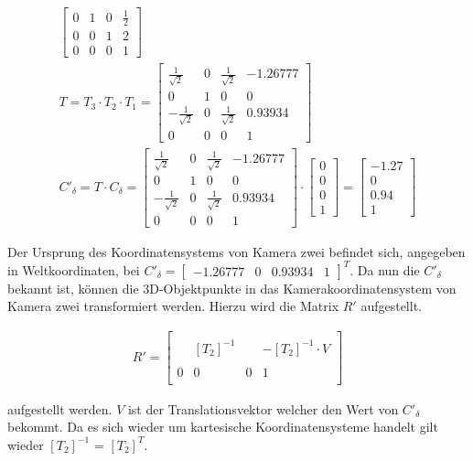 \begin{gather}
\begin{bmatrix}
	0&1&0&\frac{1}{2}\\
	0&0&1&2\\
	0&0&0&1
	\end{bmatrix}\\
	T= 
	T_3 \cdot T_2 \cdot T_1
	= 
	\begin{bmatrix}
	\frac{1}{\sqrt{2}}&0&\frac{1}{\sqrt{2}}&-1.26777\\
	0&1&0&0\\
	-\frac{1}{\sqrt{2}}&0&\frac{1}{\sqrt{2}}&0.93934\\
	0&0&0&1
	\end{bmatrix}\\
	C'_\delta = T \cdot C_\delta
	 = 	
	 \begin{bmatrix}
	\frac{1}{\sqrt{2}}&0&\frac{1}{\sqrt{2}}&-1.26777\\
	0&1&0&0\\
	-\frac{1}{\sqrt{2}}&0&\frac{1}{\sqrt{2}}&0.93934\\
	0&0&0&1
	\end{bmatrix} \cdot 
	\begin{bmatrix}
	0\\0\\0\\1
	\end{bmatrix}
	=
	\begin{bmatrix}
	-1.27\\0\\0.94\\1
	\end{bmatrix}	
\end{gather} 

Der Ursprung des Koordinatensystems von Kamera zwei befindet sich, angegeben in Weltkoordinaten, bei $C'_\delta =\begin{bmatrix}-1.26777&0&0.93934&1\end{bmatrix}^T$. Da nun die $C'_\delta$ bekannt ist, können die 3D-Objektpunkte in das Kamerakoordinatensystem von Kamera zwei transformiert werden. Hierzu wird die Matrix $R'$ aufgestellt.

\begin{gather}
	R' = \begin{bmatrix}
	&&&\\
	&[T_2]^{-1}&& -[T_2]^{-1} \cdot V\\
	&&&\\
	0&0&0&1\\
	\end{bmatrix}
\end{gather}

aufgestellt werden. $V$ ist der Translationsvektor welcher den Wert von $C'_\delta$ bekommt. Da es sich wieder um kartesische Koordinatensysteme handelt gilt wieder $[T_2]^{-1}$ = $[T_2]^{T}$.

